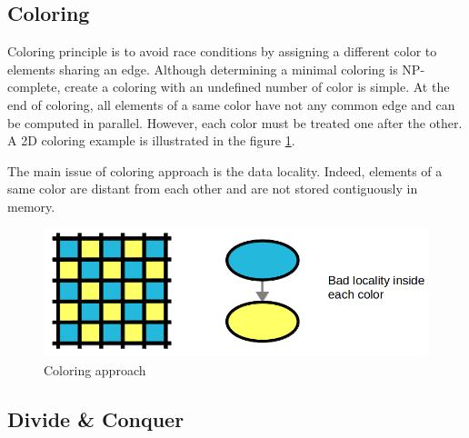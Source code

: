 \documentclass{IOS-Book-Article}
\begin{document}
\subsection{Coloring}
\label{sec:col}
Coloring principle is to avoid race conditions by assigning a different color to elements sharing an edge.
Although determining a minimal coloring is NP-complete, create a coloring with an undefined number of color is simple.
At the end of coloring, all elements of a same color have not any common edge and can be computed in parallel. However, each color must be treated one after the other.
A 2D coloring example is illustrated in the figure \ref{fig:colApp}.

The main issue of coloring approach is the data locality. Indeed, elements of a same color are distant from each other and are not stored contiguously in memory.
\begin{figure}[htp]
 \centering
 \includegraphics[scale=0.25]{Coloring_approach.png}
 \caption{Coloring approach}
 \label{fig:colApp}
\end{figure}

\subsection{Divide \& Conquer}


%
%
\end{document}
